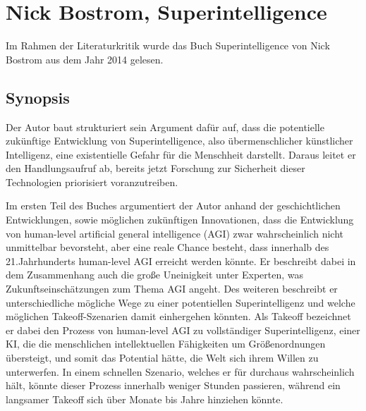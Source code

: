 \documentclass[twoside, a4paper, DIV=11, open=any, bibliography=totoc]{scrbook}
\newcommand{\Quote}[1]{\glqq #1\grqq{}}
\begin{document}

\section{Nick Bostrom, Superintelligence} \label{sec:litb}

Im Rahmen der Literaturkritik wurde das Buch Superintelligence von Nick Bostrom
aus dem Jahr 2014 gelesen.

\subsection{Synopsis} \label{sec:litsynops}

Der Autor baut strukturiert sein Argument dafür auf, dass die potentielle zukünftige
Entwicklung von \Quote{Superintelligence}, also übermenschlicher künstlicher Intelligenz,
eine existentielle Gefahr für die Menschheit darstellt. Daraus leitet er den
Handlungsaufruf ab, bereits jetzt Forschung zur Sicherheit dieser Technologien
priorisiert voranzutreiben.

Im ersten Teil des Buches argumentiert der Autor anhand der geschichtlichen Entwicklungen,
sowie möglichen zukünftigen Innovationen, dass die Entwicklung von human-level artificial
general intelligence (AGI) zwar wahrscheinlich nicht unmittelbar bevorsteht, aber
eine reale Chance besteht, dass innerhalb des 21.Jahrhunderts human-level AGI
erreicht werden könnte. Er beschreibt dabei in dem Zusammenhang auch die große
Uneinigkeit unter Experten, was Zukunftseinschätzungen zum Thema AGI angeht.
Des weiteren beschreibt er unterschiedliche mögliche Wege zu einer potentiellen
Superintelligenz und welche möglichen \Quote{Takeoff}-Szenarien damit einhergehen könnten.
Als \Quote{Takeoff} bezeichnet er dabei den Prozess von human-level AGI zu
vollständiger Superintelligenz, einer KI, die die menschlichen intellektuellen Fähigkeiten
um Größenordnungen übersteigt, und somit das Potential hätte, die Welt sich ihrem
Willen zu unterwerfen. In einem schnellen Szenario, welches er für durchaus
wahrscheinlich hält, könnte dieser Prozess innerhalb
weniger Stunden passieren, während ein langsamer \Quote{Takeoff} sich über Monate
bis Jahre hinziehen könnte.
\end{document}
